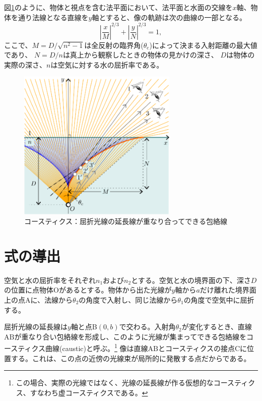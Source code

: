 \documentclass[twocolumn]{article}
\begin{document}
図\ref{fig:caustic}のように、物体と視点を含む法平面において、法平面と水面の交線を$x$軸、物体を通り法線となる直線を$y$軸とすると、像の軌跡は次の曲線の一部となる。
$$ \left| \dfrac{x}{M} \right| ^ {2/3} 
+ \left| \dfrac{y}{N} \right| ^ {2/3} = 1,$$
ここで、$M = D/\sqrt{n^2 - 1}$は全反射の臨界角($\theta_{\mathrm{c}}$)によって決まる入射距離の最大値であり、
$N = D/n$は真上から観察したときの物体の見かけの深さ、
$D$は物体の実際の深さ、$n$は空気に対する水の屈折率である。

\begin{figure}
	\centering
	\includegraphics[width=3in]{figs/g409.eps}
	\caption{コースティクス：屈折光線の延長線が重なり合ってできる包絡線}
	\label{fig:caustic}
\end{figure}
	
\section{式の導出}

空気と水の屈折率をそれぞれ$n_1$および$n_2$とする。空気と水の境界面の下、深さ$D$の位置に点物体$\mathrm{O}$があるとする。物体から出た光線が$y$軸から$a$だけ離れた境界面上の点Aに、法線から$\theta_2$の角度で入射し、同じ法線から$\theta_1$の角度で空気中に屈折する。

屈折光線の延長線は$y$軸と点B$(0, b)$で交わる。入射角$\theta_2$が変化するとき、直線${\mathrm{AB}}$が重なり合い包絡線を形成し、このように光線が集まってできる包絡線をコースティクス曲線(caustic)と呼ぶ。\footnote{この場合、実際の光線ではなく、光線の延長線が作る仮想的なコースティクス、すなわち虚コースティクスである。} 像は直線${\mathrm{AB}}$とコースティクスの接点$\mathrm{C}$に位置する。これは、この点の近傍の光線束が局所的に発散する点だからである。
\end{document}
